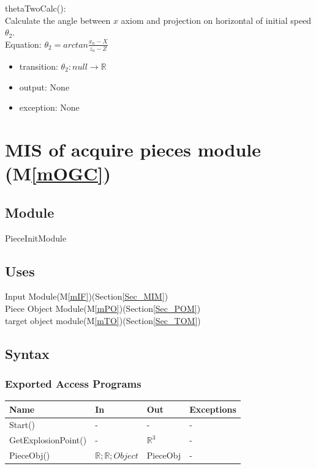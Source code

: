 \documentclass[12pt, titlepage]{article}
\newcommand{\mref}[1]{M\ref{#1}}
\begin{document}
\noindent thetaTwoCalc():\\
Calculate the angle between $x$ axiom and projection on horizontal of initial speed $\theta_{2}$.\\
Equation: $\theta_{2}=arctan \frac{x_{n}-X}{z_{n}-Z}$\\
\begin{itemize}
	\item transition: $\theta_{2}: null \to \mathbb{R}$  
	\item output: None
	\item exception: None
\end{itemize}

\section{MIS of acquire pieces module (\mref{mOGC})} 
\label{Sec_MAP}
\subsection{Module}

PieceInitModule

\subsection{Uses}

Input Module(\mref{mIF})(Section\ref{Sec_MIM})\\
Piece Object Module(\mref{mPO})(Section\ref{Sec_POM})\\
target object module(\mref{mTO})(Section\ref{Sec_TOM})\\

\subsection{Syntax}

\subsubsection{Exported Access Programs}

\begin{center}
	\begin{tabular}{p{2cm} p{4cm} p{4cm} p{2cm}}
		\hline
		\textbf{Name} & \textbf{In} & \textbf{Out} & \textbf{Exceptions} \\
		\hline
		Start() & - & - & -\\
		GetExplosionPoint() & - & $\mathbb{R}^{3}$ & -\\
		PieceObj() & $\mathbb{R};\mathbb{R};Object$ & PieceObj & -\\
		\hline		
	\end{tabular}
\end{center}
\end{document}
